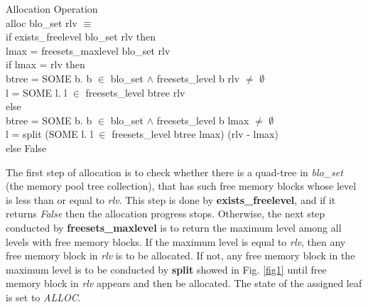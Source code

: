 \documentclass[runningheads]{llncs}
\begin{document}
\begin{definition} {Allocation Operation} \\
alloc blo\_set rlv $\equiv$ \\
\phantom{x} \hspace{10pt} if exists\_freelevel blo\_set rlv then \\
\phantom{x} \hspace{20pt} lmax = freesets\_maxlevel blo\_set rlv \\
\phantom{x} \hspace{20pt} if lmax = rlv then \\
\phantom{x} \hspace{30pt} btree = SOME b. b $\in$ blo\_set $\wedge$ freesets\_level b rlv $\ne$ $\emptyset$ \\
\phantom{x} \hspace{30pt} l = SOME l. l $\in$ freesets\_level btree rlv \\
\phantom{x} \hspace{20pt} else \\
\phantom{x} \hspace{30pt} btree = SOME b. b $\in$ blo\_set $\wedge$ freesets\_level b lmax $\ne$ $\emptyset$ \\
\phantom{x} \hspace{30pt} l = split (SOME l. l $\in$ freesets\_level btree lmax) (rlv - lmax) \\
\phantom{x} \hspace{10pt} else False
\end{definition}

The first step of allocation is to check whether there is a quad-tree in \textsl{blo\_set} (the memory pool tree collection), that has such free memory blocks whose level is less than or equal to \textsl{rlv}. This step is done by \textbf{exists\_freelevel}, and if it returns \textsl{False} then the allocation progress stops. Otherwise, the next step conducted by \textbf{freesets\_maxlevel} is to return the maximum level among all levels with free memory blocks. If the maximum level is equal to \textsl{rlv}, then any free memory block in \textsl{rlv} is to be allocated. If not, any free memory block in the maximum level is to be conducted by \textbf{split} showed in Fig. \ref{fig1} until free memory block in \textsl{rlv} appears and then be allocated. The state of the assigned leaf is set to \textsl{ALLOC}.
\end{document}
